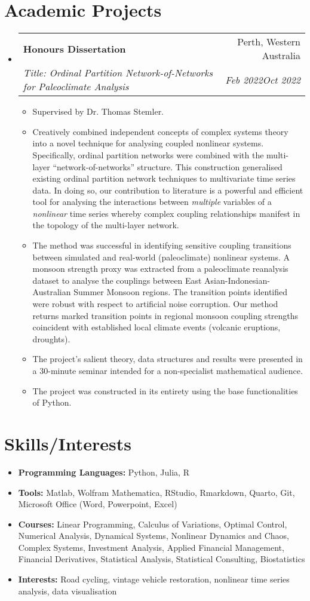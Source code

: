 \documentclass[letterpaper,10.8pt]{article}
\makeatletter
\newcommand{\resumeItem}[2]{
  \item\small{
    \textbf{#1}{#2 \vspace{-2pt}}
  }
}
\newcommand{\resumeSubheading}[4]{
  \vspace{-1pt}\item
    \begin{tabular*}{0.97\textwidth}{l@{\extracolsep{\fill}}r}
      \textbf{#1} & #2 \\
      \textit{\small#3} & \textit{\small #4} \\
    \end{tabular*}\vspace{-5pt}
}
\newcommand{\resumeSubItem}[2]{\resumeItem{#1}{#2}\vspace{-4pt}}
\newcommand{\resumeSubHeadingListStart}{\begin{itemize}[leftmargin=*]}
\newcommand{\resumeSubHeadingListEnd}{\end{itemize}}
\newcommand{\resumeItemListStart}{\begin{itemize}}
\newcommand{\resumeItemListEnd}{\end{itemize}\vspace{-5pt}}
\makeatother
\begin{document}
\section{Academic Projects}
\resumeSubHeadingListStart
\resumeSubheading
    {Honours Dissertation}{Perth, Western Australia}
    {Title: Ordinal Partition Network-of-Networks for Paleoclimate Analysis}{Feb 2022\textendash Oct 2022}
    \resumeItemListStart
    \resumeItem{}{Supervised by Dr. Thomas Stemler.}
    \resumeItem{}{Creatively combined independent concepts of complex systems theory into a novel technique for analysing coupled nonlinear systems. Specifically, ordinal partition networks were combined with the multi-layer ``network-of-networks'' structure. This construction generalised existing ordinal partition network techniques to multivariate time series data. In doing so, our contribution to literature is a powerful and efficient tool for analysing the interactions between \emph{multiple} variables of a \emph{nonlinear} time series whereby complex coupling relationships manifest in the topology of the multi-layer network.}
    \resumeItem{}{The method was successful in identifying sensitive coupling transitions between simulated and real-world (paleoclimate) nonlinear systems. A monsoon strength proxy was extracted from a paleoclimate reanalysis dataset to analyse the couplings between East Asian-Indonesian-Australian Summer Monsoon regions. The transition points identified were robust with respect to artificial noise corruption. Our method returns marked transition points in regional monsoon coupling strengths coincident with established local climate events (volcanic eruptions, droughts).}
    \resumeItem{}{The project's salient theory, data structures and results were presented in a 30-minute seminar intended for a non-specialist mathematical audience.}
    \resumeItem{}{The project was constructed in its entirety using the base functionalities of Python.}
    
    \resumeItemListEnd
\resumeSubHeadingListEnd

\section{Skills/Interests}
	\resumeSubHeadingListStart
	\resumeSubItem{Programming Languages: }{Python, Julia, R}
	\resumeSubItem{Tools: }{Matlab, Wolfram Mathematica, RStudio, Rmarkdown, Quarto, Git, Microsoft Office (Word, Powerpoint, Excel)}
	\resumeSubItem{Courses: }{Linear Programming, Calculus of Variations, Optimal Control, Numerical Analysis, Dynamical Systems, Nonlinear Dynamics and Chaos, Complex Systems, Investment Analysis, Applied Financial Management, Financial Derivatives, Statistical Analysis, Statistical Consulting, Biostatistics}
	\resumeSubItem{Interests: }{Road cycling, vintage vehicle restoration, nonlinear time series analysis, data visualisation}
\resumeSubHeadingListEnd
\end{document}
